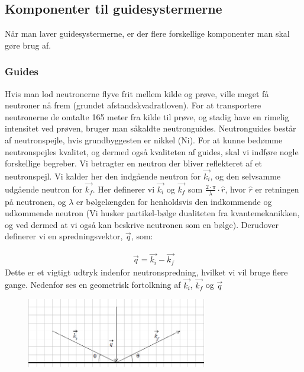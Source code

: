 \documentclass[12pt,oneside,a4paper]{article}
\begin{document}
{{{{{\subsection{Komponenter til guidesystermerne}
Når man laver guidesystermerne, er der flere forskellige komponenter man skal gøre brug af.

\subsubsection{Guides}

Hvis man lod neutronerne flyve frit mellem kilde og prøve, ville meget få neutroner nå frem (grundet afstandskvadratloven). For at transportere neutronerne de omtalte 165 meter fra kilde til prøve, og stadig have en rimelig intensitet ved prøven, bruger man såkaldte neutronguides. Neutronguides består af neutronspejle, hvis grundbyggesten er nikkel (Ni).
For at kunne bedømme neutronspejles kvalitet, og dermed også kvaliteten af guides, skal vi indføre nogle forskellige begreber. Vi betragter en neutron der bliver reflekteret af et neutronspejl. Vi kalder her den indgående neutron for $\vec{k_i}$, og den selvsamme udgående neutron for  $\vec{k_f}$. Her definerer vi $\vec{k_i}$ og $\vec{k_f}$ som  $ {\frac{2 \cdot \pi}{\lambda}} \cdot \hat{r}$, hvor $\hat{r}$ er retningen på neutronen, og $\lambda$ er bølgelængden for henholdsvis den indkommende og udkommende neutron (Vi husker partikel-bølge dualiteten fra kvantemekanikken, og ved dermed at vi også kan beskrive neutronen som en bølge). Derudover definerer vi en spredningsvektor, $\vec{q}$, som:

\begin{align}
\vec{q}=\vec{k_i}-\vec{k_f}
\end{align}
Dette er et vigtigt udtryk indenfor neutronspredning, hvilket vi vil bruge flere gange. Nedenfor ses en geometrisk fortolkning af $\vec{k_i}$, $\vec{k_f}$  og $ \vec{q}$

\begin{figure}[H]
\centering
\includegraphics[width=0.7\textwidth]{billede3.png}
\caption{\label{Billede}}
\end{figure}

}}}}}
\end{document}

